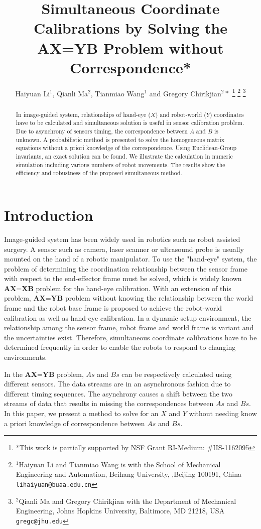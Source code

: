 \documentclass[letterpaper, 10 pt, conference]{ieeeconf}  %
\title{\LARGE \bf
Simultaneous Coordinate Calibrations by Solving the AX=YB Problem without Correspondence*
}
\author{Haiyuan Li$^{1}$, Qianli Ma$^{2}$, Tianmiao Wang$^{1}$ and Gregory Chirikjian$^{2}*$%
\thanks{*This work is partially
supported by NSF Grant RI-Medium: \#IIS-1162095}%
\thanks{$^{1}$Haiyuan Li and Tianmiao Wang is with the School of Mechanical Engineering and Automation, Beihang University,
        ,Beijing 100191, China
        {\tt\small lihaiyuan@buaa.edu.cn}}%
\thanks{$^{2}$Qianli Ma and Gregory Chirikjian with the Department of Mechanical Engineering, Johns Hopkins University,
        Baltimore, MD 21218, USA
        {\tt\small gregc@jhu.edu}}%
}
\begin{document}
\maketitle
\thispagestyle{empty}
\pagestyle{empty}


\begin{abstract}

In image-guided system, relationships of hand-eye ($X$) and robot-world ($Y$) coordinates have to be calculated and simultaneous solution is useful in sensor calibration problem. Due to asynchrony of sensors timing, the correspondence between $A$ and $B$ is unknown. A probabilistic method is presented to solve the
homogeneous matrix equations without a priori knowledge of the correspondence. Using Euclidean-Group invariants, an exact solution can be found. We illustrate the calculation in numeric simulation including various numbers of
robot movements. The results show the efficiency and robustness of the proposed simultaneous
method.

\end{abstract}



\section{Introduction}

Image-guided system has been widely used in robotics such as robot assisted surgery. A sensor such as camera, laser scanner or ultrasound probe is usually mounted on the hand of a robotic manipulator. To use the "hand-eye" system, the problem of determining the coordination relationship between the sensor frame with respect to the end-effector frame must be solved, which is widely known $\textbf{AX=XB}$ problem for the hand-eye calibration. With an extension of this problem, $\textbf{AX=YB}$ problem without knowing the relationship between the world frame and the robot base frame is proposed to achieve the robot-world calibration as well as hand-eye calibration. In a dynamic setup environment, the relationship among the sensor frame, robot frame and world frame is variant and the uncertainties exist. Therefore, simultaneous coordinate calibrations have to be determined frequently in order to enable the robots to respond to changing environments.

In the $\textbf{AX=YB}$ problem, $As$ and $Bs$ can be respectively calculated using different sensors. The data streams are in an asynchronous fashion due to different timing sequences. The asynchrony causes a shift between the two streams of data that results in missing the correspondences between $As$ and $Bs$. In this paper, we present a method to solve for an $X$ and $Y$ without needing know a priori knowledge of correspondence between $As$ and $Bs$.
\end{document}
